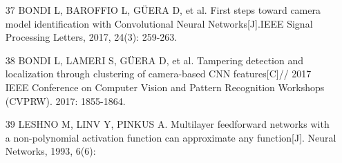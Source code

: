 \documentclass{article}
\begin{document}
\begin{itemize}
\item 
[37] BONDI L, BAROFFIO L, GÜERA D, et al. First steps toward camera model identification with Convolutional Neural Networks[J].IEEE Signal Processing Letters, 2017, 24(3): 259-263.

\item 
[38] BONDI L, LAMERI S, GÜERA D, et al. Tampering detection and localization through clustering of camera-based CNN features[C]// 2017 IEEE Conference on Computer Vision and Pattern Recognition Workshops (CVPRW). 2017: 1855-1864.

\item 
[39] LESHNO M, LINV Y, PINKUS A. Multilayer feedforward networks with a non-polynomial activation function can approximate any function[J]. Neural Networks, 1993, 6(6):

\end{itemize}
\end{document}

